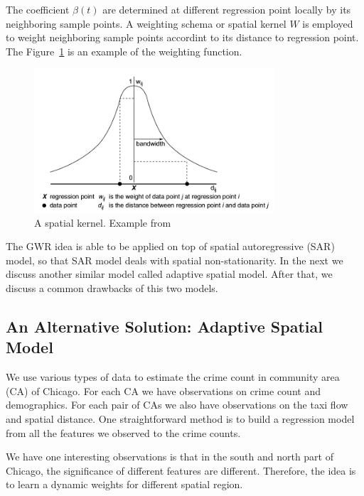 The coefficient $\beta(t)$ are determined at different regression point locally by its neighboring sample points. A weighting schema or spatial kernel $W$ is employed to weight neighboring sample points accordint to its distance to regression point. The Figure~\ref{fig:spa-kernel} is an example of the weighting function.


\begin{figure}[h]
\centering
\includegraphics[width=0.8\textwidth]{fig/spatial-kernel.png}
\caption{A spatial kernel. Example from ~\cite{GWR03}}
\label{fig:spa-kernel}
\end{figure}



The GWR idea is able to be applied on top of spatial autoregressive (SAR) model, so that SAR model deals with spatial non-stationarity.  In the next we discuss another similar model called adaptive spatial model. After that, we discuss a common drawbacks of this two models.


\subsection{An Alternative Solution: Adaptive Spatial Model}


We use various types of data to estimate the crime count in community area (CA) of Chicago. For each CA we have observations on crime count and demographics. For each pair of CAs we also have observations on the taxi flow and spatial distance. One straightforward method is to build a regression model from all the features we observed to the crime counts.

We have one interesting observations is that in the south and north part of Chicago, the significance of different features are different. Therefore, the idea is to learn a dynamic weights for different spatial region.



